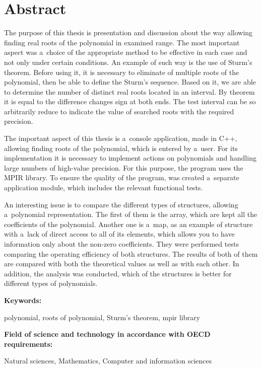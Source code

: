 \chapter*{Abstract}

The purpose of this thesis is presentation and discussion about the way allowing finding real roots of the polynomial in examined range. The most important aspect was a~choice of the appropriate method to be effective in each case and not only under certain conditions. An example of such way is the use of Sturm’s theorem. Before using it, it is necessary to eliminate of multiple roots of the polynomial, then be able to define the Sturm’s sequence. Based on it, we are able to determine the number of distinct real roots located in an interval. By theorem it is equal to the difference changes sign at both ends. The test interval can be so arbitrarily reduce to indicate the value of searched roots with the required precision.

The important aspect of this thesis is a~console application, made in C++, allowing finding roots of the polynomial, which is entered by a~user. For its implementation it is necessary to implement actions on polynomials and handling large numbers of high-value precision. For this purpose, the program uses the MPIR library. To ensure the quality of the program, was created a~separate application module, which includes the relevant functional tests.

An interesting issue is to compare the different types of structures, allowing a~polynomial representation. The first of them is the array, which are kept all the coefficients of the polynomial. Another one is a~map, as an example of structure with a~lack of direct access to all of its elements, which allows you to have information only about the non-zero coefficients. They were performed tests comparing the operating efficiency of both structures. The results of both of them are compared with both the theoretical values as well as with each other. In addition, the analysis was conducted, which of the structures is better for different types of polynomials.

\vspace{12pt}
\noindent\textbf{Keywords: }

polynomial, roots of polynomial, Sturm’s theorem, mpir library

\vspace{12pt}
\noindent\textbf{Field of science and technology in accordance with OECD requirements:}

Natural sciences, Mathematics, Computer and information sciences